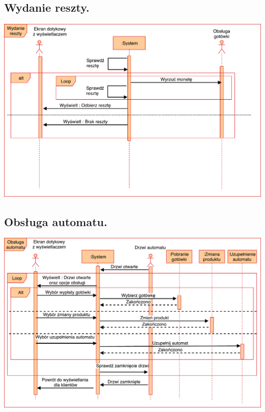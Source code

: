 \documentclass[11pt]{article}
\begin{document}
		\subsection{Wydanie reszty.}
		\begin{center}
			\includegraphics[scale=0.65]{WydanieReszty.pdf}
		\end{center}
		\newpage
		\subsection{Obsługa automatu.}
		\begin{center}
			\includegraphics[scale=0.65]{ObslugaAutomatu.pdf}
		\end{center}
		\newpage
\end{document}
